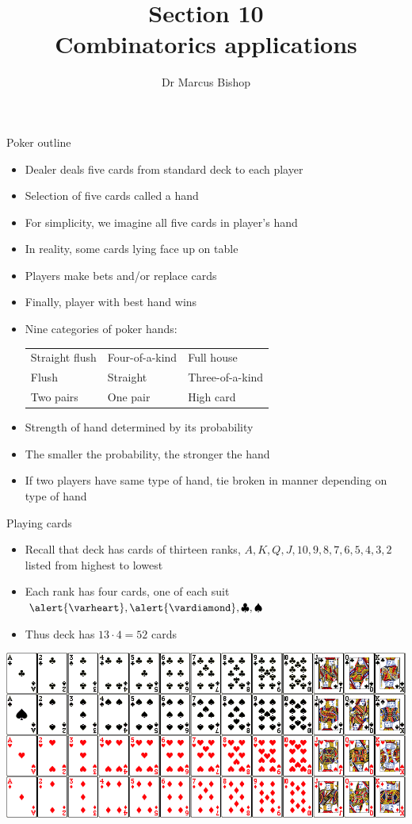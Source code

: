 \documentclass[xcolor=dvipsnames]{beamer}
\title[\S10]{Section 10\\Combinatorics applications}
\author{Dr Marcus Bishop}
\theoremstyle{definition}
\newcommand{\hs}{\alert{\varheart}}
\newcommand{\ds}{\alert{\vardiamond}}
\newcommand{\s}{\spadesuit}
\newcommand{\cs}{\clubsuit}
\begin{document}
\begin{frame}\titlepage\end{frame}
\LogoOff

\begin{frame}{Poker outline}
\begin{itemize}
\item Dealer deals five cards from standard deck
to each player
\item Selection of five cards called a \alert{hand}
\item For simplicity, we imagine all five cards in player's hand
\item In reality, some cards lying face up on table
\item Players make bets and/or replace cards
\item Finally, player with \alert{best hand} wins
\item Nine categories of poker hands:
\begin{tabular}{lll}
Straight flush&Four-of-a-kind&Full house\\
Flush&Straight&Three-of-a-kind\\
Two pairs&One pair&High card
\end{tabular}
\item Strength of hand determined by its probability
\item The smaller the probability, the stronger the hand
\item If two players have same type of hand, tie
broken in manner depending on type of hand
\end{itemize}
\end{frame}

\begin{frame}{Playing cards}
\begin{itemize}
\item Recall that deck has cards of thirteen \alert{ranks},
$A,K,Q,J,10,9,8,7,6,5,4,3,2$
listed from highest to lowest
\item Each rank has four cards, one of each \alert{suit} $\hs,\ds,\cs,\s$
\item Thus deck has $13\cdot 4=52$ cards
\end{itemize}
\includegraphics[scale=.3]{cards}
\end{frame}
\end{document}
